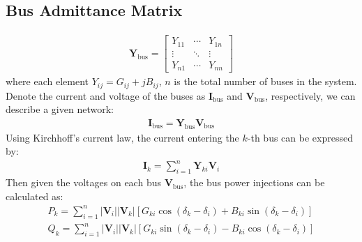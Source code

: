 \documentclass[journal,12pt,onecolumn,draftclsnofoot]{IEEEtran}
\newcommand{\V}{\boldsymbol{V}}
\newcommand{\I}{\boldsymbol{I}}
\newcommand{\Y}{\boldsymbol{Y}}
\theoremstyle{definition}
\begin{document}
\subsection{Bus Admittance Matrix}
\begin{align*}
\Y_{\text{bus}} = 
\begin{bmatrix}
Y_{11} & \cdots & Y_{1n} \\
\vdots & \ddots & \vdots \\
Y_{n1} & \cdots & Y_{nn}
\end{bmatrix}
\end{align*}
where each element $Y_{ij}=G_{ij}+jB_{ij}$, $n$ is the total number of buses in the system. Denote the current and voltage of the buses as $\I_{\text{bus}}$ and $\V_{\text{bus}}$, respectively, we can describe a given network:
\begin{align}
\I_{\text{bus}} = \Y_{\text{bus}}\V_{\text{bus}}
\end{align}
Using Kirchhoff's current law, the current entering the $k$-th bus can be expressed by:
\begin{align}
\I_k = \sum_{i=1}^n \Y_{ki}\V_i
\end{align}
Then given the voltages on each bus $\V_{\text{bus}}$, the bus power injections can be calculated as:
\begin{align}
\label{node}
P_k = \sum_{i=1}^n |\V_i||\V_k|[G_{ki}\cos(\delta_k-\delta_i)+B_{ki}\sin(\delta_k-\delta_i)]\\
Q_k = \sum_{i=1}^n |\V_i||\V_k|[G_{ki}\sin(\delta_k-\delta_i)-B_{ki}\cos(\delta_k-\delta_i)]
\end{align}
\end{document}
